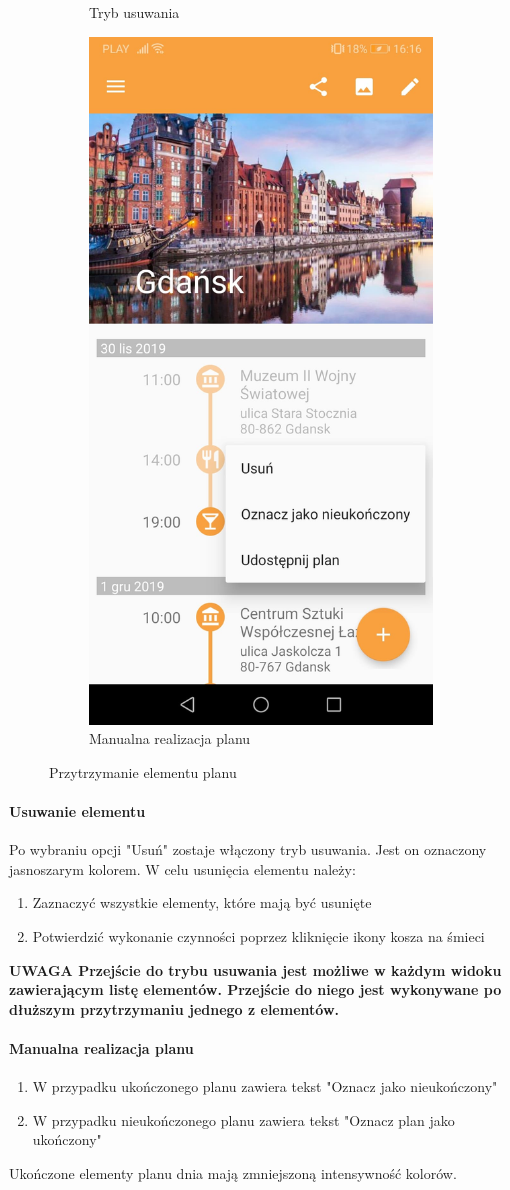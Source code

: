 \documentclass[10pt,twoside,a4paper]{report}
\begin{document}
\begin{figure}[h]
\begin{subfigure}{0.3\textwidth}
\caption{Tryb usuwania }
\label{fig:deleteMode}
\end{subfigure}
\begin{subfigure}{0.3\textwidth}
\centering
\includegraphics[width=0.9\linewidth, width=5cm]{popUpMenu}
\caption{Manualna realizacja planu}
\label{fig:popUpMenu}
\end{subfigure}
\caption{Przytrzymanie elementu planu}
\label{fig:podrecznik5}
\end{figure}
\FloatBarrier

\paragraph{Usuwanie elementu}
Po wybraniu opcji "Usuń" zostaje włączony tryb usuwania.
Jest on oznaczony jasnoszarym kolorem.
W celu usunięcia elementu należy:
\begin{enumerate}
\item Zaznaczyć wszystkie elementy, które mają być usunięte
\item Potwierdzić wykonanie czynności poprzez kliknięcie ikony kosza na śmieci
\end{enumerate}
\textbf{UWAGA Przejście do trybu usuwania jest możliwe w każdym widoku zawierającym listę elementów. Przejście do niego jest wykonywane po dłuższym przytrzymaniu jednego z elementów.}



\paragraph{Manualna realizacja planu}
\begin{enumerate}
\item W przypadku ukończonego planu zawiera tekst "Oznacz jako nieukończony"
\item W przypadku nieukończonego planu zawiera tekst "Oznacz plan jako ukończony"
\end{enumerate}
Ukończone elementy planu dnia mają zmniejszoną intensywność kolorów.
\end{document}
